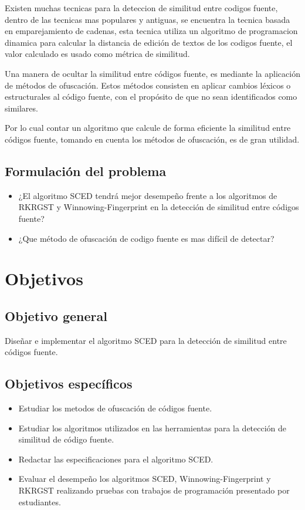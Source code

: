 Existen muchas tecnicas para la deteccion de similitud entre codigos fuente, dentro de las tecnicas mas populares y antiguas, se encuentra la tecnica basada en emparejamiento de cadenas, esta tecnica utiliza un algoritmo de programacion dinamica para calcular la distancia de edición de textos de los codigos fuente, el valor calculado es usado como métrica de similitud.

Una manera de ocultar la similitud entre códigos fuente, es mediante la aplicación de métodos de ofuscación. Estos métodos consisten en aplicar cambios léxicos o estructurales al código fuente, con el propósito de que no sean identificados como similares.

Por lo cual contar un algoritmo que calcule de forma eficiente la similitud entre códigos fuente, tomando en cuenta los métodos de ofuscación, es de gran utilidad.

\subsection{Formulación del problema}
\begin{itemize}
  \item ¿El algoritmo SCED tendrá mejor desempeño frente a los algoritmos de RKRGST y Winnowing-Fingerprint en la detección de similitud entre códigos fuente?
  \item ¿Que método de ofuscación de codigo fuente es mas difícil de detectar?
\end{itemize}

\section{Objetivos}
\subsection{Objetivo general}
Diseñar e implementar el algoritmo SCED para la detección de similitud entre códigos fuente.
\subsection{Objetivos específicos}
\begin{itemize}
    \item Estudiar los metodos de ofuscación de códigos fuente.
    \item Estudiar los algoritmos utilizados en las herramientas para la detección de similitud de código fuente.
    \item Redactar las especificaciones para el algoritmo SCED.
    \item Evaluar el desempeño los algoritmos SCED, Winnowing-Fingerprint y RKRGST realizando pruebas con trabajos de programación presentado por estudiantes.
\end{itemize}

